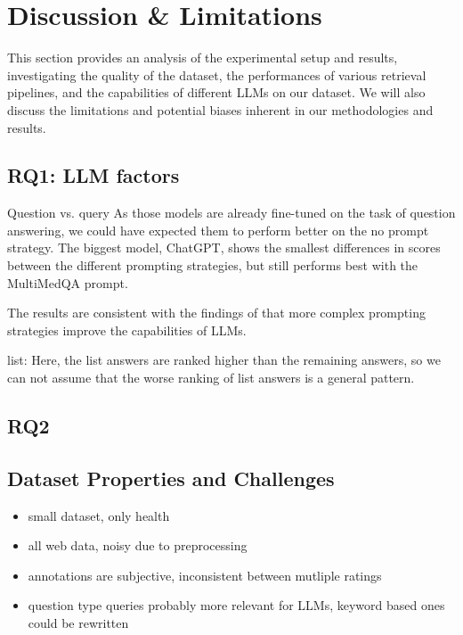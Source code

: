 \chapter{Discussion \& Limitations}\label{discussion}

This section provides an analysis of the experimental setup and results, investigating the quality of the dataset, the performances of various retrieval pipelines, and the capabilities of different LLMs on our dataset.
We will also discuss the limitations and potential biases inherent in our methodologies and results.

\section{RQ1: LLM factors}


Question vs. query
As those models are already fine-tuned on the task of question answering, we could have expected them to perform better on the no prompt strategy.
The biggest model, ChatGPT, shows the smallest differences in scores between the different prompting strategies, but still performs best with the MultiMedQA prompt.

The results are consistent with the findings of \cite{reynolds:2021:Prompt} that more complex prompting strategies improve the capabilities of LLMs.

list:
Here, the list answers are ranked higher than the remaining answers, so we can not assume that the worse ranking of list answers is a general pattern.
\section{RQ2}

\section{Dataset Properties and Challenges}
\begin{itemize}
    \item small dataset, only health
    \item all web data, noisy due to preprocessing
    \item annotations are subjective, inconsistent between mutliple ratings
    \item question type queries probably more relevant for LLMs, keyword based ones could be rewritten
\end{itemize}


